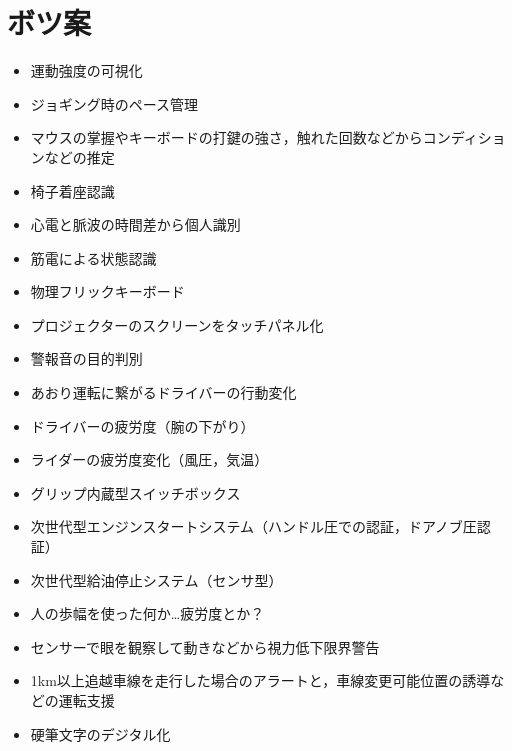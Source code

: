 \documentclass[a4j,twocolumn,10pt]{jarticle}
\begin{document}
\section{ボツ案}
\begin{itemize}
  \item 運動強度の可視化
  \item ジョギング時のペース管理
  \item マウスの掌握やキーボードの打鍵の強さ，触れた回数などからコンディションなどの推定
  \item 椅子着座認識
  \item 心電と脈波の時間差から個人識別
  \item 筋電による状態認識
  \item 物理フリックキーボード
  \item プロジェクターのスクリーンをタッチパネル化
  \item 警報音の目的判別
  \item あおり運転に繋がるドライバーの行動変化
  \item ドライバーの疲労度（腕の下がり）
  \item ライダーの疲労度変化（風圧，気温）
  \item グリップ内蔵型スイッチボックス
  \item 次世代型エンジンスタートシステム（ハンドル圧での認証，ドアノブ圧認証）
  \item 次世代型給油停止システム（センサ型）
  \item 人の歩幅を使った何か…疲労度とか？
  \item センサーで眼を観察して動きなどから視力低下限界警告
  \item 1km以上追越車線を走行した場合のアラートと，車線変更可能位置の誘導などの運転支援
  \item 硬筆文字のデジタル化
\end{itemize}

\end{document}
